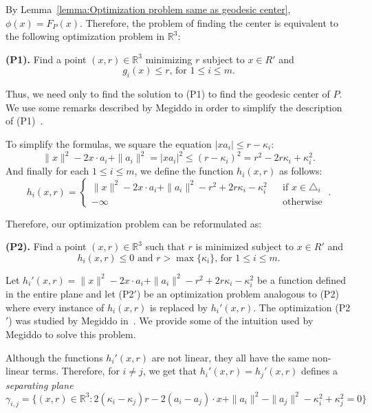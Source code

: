 \documentclass[a4paper,UKenglish]{lipics}
\newcommand{\F}[2]{\ensuremath{F_{\scriptscriptstyle #1}(#2)}}
\newcommand{\reg}{\ensuremath{R'}}
\begin{document}
By Lemma~\ref{lemma:Optimization problem same as geodesic center}, $\phi(x) = \F{P}{x}$. 
Therefore, the problem of finding the center is equivalent to the following optimization problem in $\mathbb{R}^3$:

\textbf{(P1).} Find a point $(x,r)\in \mathbb{R}^3$ minimizing $r$ subject to $x\in \reg$ and
$$\text{$g_i(x) \leq r$, for $1\leq i \leq m$}.$$

Thus, we need only to find the solution to (P1) to find the geodesic center of $P$.
We use some remarks described by Megiddo in order to simplify the description of (P1)~\cite{megiddo1989ball}.

To simplify the formulas, we square the equation $|x a_i| \leq r - \kappa_i$:
$$\|x\|^2 - 2x\cdot a_i + \|a_i\|^2  = |x a_i|^2 \leq (r - \kappa_i)^2 = r^2 - 2r\kappa_i + \kappa_i^2.$$ 
And finally for each $1\leq i\leq m$, we define the function $h_i(x, r)$ as follows:
$$h_i(x, r) = \left\{ \begin{array}{lll}
 \|x\|^2 - 2x\cdot a_i + \|a_i\|^2  - r^2 + 2r\kappa_i - \kappa_i^2 && \text{if }x\in \triangle_i\\
-\infty&&\text{otherwise}
\end{array}\right. \ .$$

Therefore, our optimization problem can be reformulated as:

\textbf{(P2).} Find a point $(x,r)\in \mathbb{R}^3$ such that $r$ is minimized subject to $x\in \reg$ and 
$$h_i(x, r) \leq 0 \text{ and  $r > \max\{\kappa_i\}$, for $1\leq i \leq m$}.$$

Let $h_i'(x,r) = \|x\|^2 - 2x\cdot a_i + \|a_i\|^2  - r^2 + 2r\kappa_i - \kappa_i^2$ be a function defined in the entire plane and let (P2$'$) be an optimization problem analogous to (P2) where every instance of $h_i(x,r)$ is replaced by $h_i'(x,r)$.
The optimization (P2$'$) was studied by Megiddo in~\cite{megiddo1989ball}. We provide some of the intuition used by Megiddo to solve this problem.

Although the functions $h_i'(x,r)$ are not linear, they all have the same non-linear terms. Therefore, for $i\neq j$, we get that
$h_i'(x,r) = h_j'(x, r)$ defines a \emph{separating plane}
$$\gamma_{i,j} = \{(x, r) \in \mathbb{R}^3:  2( \kappa_i - \kappa_j) r - 2 (a_i - a_j) \cdot x + \|a_i\|^2 - \|a_j\|^2 - \kappa_i^2 + \kappa_j^2 = 0\}$$
\end{document}
